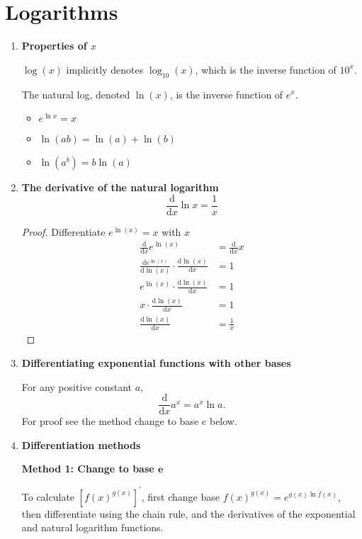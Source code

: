 \section{Logarithms}
\begin{enumerate}
    \item \textbf{Properties of $x$}

        $\log(x)$ implicitly denotes $\log_{10}(x)$, which is the inverse function of $10^x$.

        The natural log, denoted $\ln(x)$, is the inverse function of $e^x$.
        \begin{itemize}
            \item $e^{\ln x}=x$
            \item $\ln(ab)=\ln(a)+\ln(b)$
            \item $\ln(a^b)=b\ln(a)$
        \end{itemize}
    \item \textbf{The derivative of the natural logarithm}
        $$
        \frac{\mathrm{d}}{\mathrm{d}x}\ln x=\frac{1}{x}
        $$
        \begin{proof}
            Differentiate $e^{\ln(x)}=x$ with $x$
            \begin{align*}
                \frac{\mathrm{d}}{\mathrm{d}x}e^{\ln(x)} & =\frac{\mathrm{d}}{\mathrm{d}x}x \\
                \frac{\mathrm{d}e^{\ln(x)}}{\mathrm{d}\ln(x)}\cdot\frac{\mathrm{d}\ln(x)}{\mathrm{d}x} & =1 \\
                e^{\ln(x)}\cdot\frac{\mathrm{d}\ln(x)}{\mathrm{d}x} & =1 \\
                x\cdot\frac{\mathrm{d}\ln(x)}{\mathrm{d}x} & =1 \\
                \frac{\mathrm{d}\ln(x)}{\mathrm{d}x} & =\frac{1}{x}
            \end{align*}
        \end{proof}
    \item \textbf{Differentiating exponential functions with other bases}

        For any positive constant $a$,
        $$
        \frac{\mathrm{d}}{\mathrm{d}x}a^x=a^x\ln a.
        $$
        For proof see the method change to base $e$ below.
    \item \textbf{Differentiation methods}
        
        \textbf{Method 1: Change to base $\bm{e}$}

        To calculate $\left[f(x)^{g(x)}\right]^\prime$, first change base $f(x)^{g(x)}=e^{g(x)\ln f(x)}$, then differentiate using the chain rule, and the derivatives of the exponential and natural logarithm functions.


\end{enumerate}
